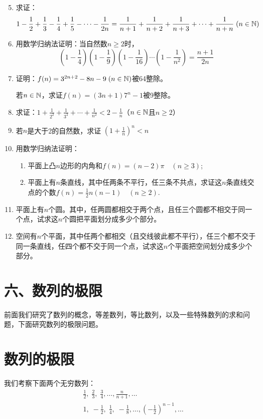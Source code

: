 \begin{enumerate}\setcounter{enumi}{4}
    \item 求证：$$1-\dfrac{1}{2}+\dfrac{1}{3}-\dfrac{1}{4}+\dfrac{1}{5}-\cdots-\dfrac{1}{2n}=\dfrac{1}{n+1}+\dfrac{1}{n+2}+\dfrac{1}{n+3}+\cdots+\dfrac{1}{n+n}\; (n\in\mathbb{N})$$
\item 用数学归纳法证明：当自然数$n\ge 2$时，
\[\left(1-\frac{1}{4}\right)\left(1-\frac{1}{9}\right)\left(1-\frac{1}{16}\right)\cdots \left(1-\frac{1}{n^2}\right)=\frac{n+1}{2n}\]
\item 证明：$f(n)=3^{2n+2}-8n-9\; (n\in\mathbb{N})$被64整除。

若$n\in\mathbb{N}$，求证$f(n)=(3n+1)7^n-1$被9整除。
\item 求证：$1+\frac{1}{2^2}+\frac{1}{3^2}+\cdots +\frac{1}{n^2}<2-\frac{1}{n}$（$n\in\mathbb{N}$且$n\ge 2$）
\item 若$n$是大于2的自然数，求证
$\left(1+\frac{1}{n}\right)^n<n$
\item 用数学归纳法证明：
\begin{enumerate}[(1)]
\item 平面上凸$n$边形的内角和$f(n)=(n-2)\pi\quad (n\ge 3)$;
\item 平面上有$n$条直线，其中任两条不平行，任三条不共点，求证这$n$条直线交点的个数$f(n)=\frac{1}{2}n(n-1)\quad (n\ge 2)$.
\end{enumerate}

\item 平面上有$n$个圆。其中，任两圆都相交于两个点，且任三个圆都不相交于同一个点，试求这$n$个圆把平面划分成多少个部分。
\item 空间有$n$个平面，其中任两个都相交（且交线彼此都不平行），任三个都不交于同一条直线，任四个都不交于同一个点，试求这$n$个平面把空间划分成多少个部分。
\end{enumerate}

\section*{六、数列的极限}
前面我们研究了数列的概念，等差数列，等比数列，以及一些特殊数列的求和问题，下面研究数列的极限问题。

\section{数列的极限}

我们考察下面两个无穷数列：
\begin{align}
&\frac{1}{2},\; \frac{2}{3},\; \frac{3}{4},\ldots, \frac{n}{n+1},\ldots \tag{1}\\
&1,\; -\frac{1}{2},\; \frac{1}{4},\; -\frac{1}{8},\ldots, \left(-\frac{1}{2}\right)^{n-1},\ldots \tag{2}
\end{align}

